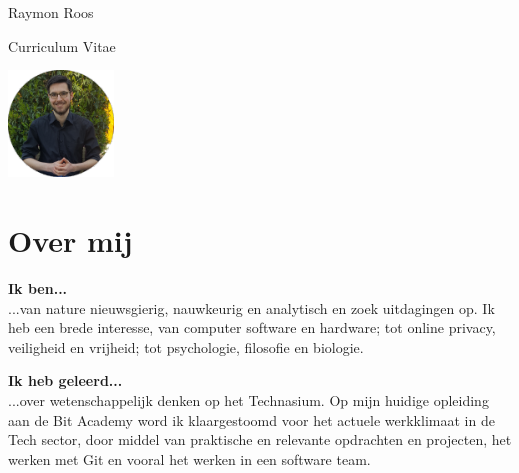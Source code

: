 \documentclass[
	11pt, %
]{FreemanCV}
\begin{document}
\begin{paracol}{2} %

	\parbox[][0.25\textheight][c]{\linewidth}{ %
		\centering %
		{\sffamily\Huge Raymon Roos} %
		\medskip %

		\vspace{-5pt}
		{\cursivefont\Large\textcolor{headings}{Curriculum Vitae}}

		\begin{center}
			\includegraphics[width=0.21\textwidth,origin=c]{me_myself.jpg}
		\end{center}
		\vspace{-15pt}
	}

	\section{Over mij}

	\textbf{Ik ben...}\\
	...van nature nieuwsgierig, nauwkeurig en analytisch en zoek uitdagingen op. Ik heb een brede 
	interesse, van computer software en hardware; tot online privacy, veiligheid en 
	vrijheid; tot psychologie, filosofie en biologie.

	\textbf{Ik heb geleerd...}\\
	...over wetenschappelijk denken op het Technasium. Op mijn huidige opleiding aan de 
	Bit Academy word ik klaargestoomd voor het actuele werkklimaat in de Tech sector, door 
	middel van praktische en relevante opdrachten en projecten, het werken met Git en 
	vooral het werken in een software team. 


\end{paracol}
\end{document}
